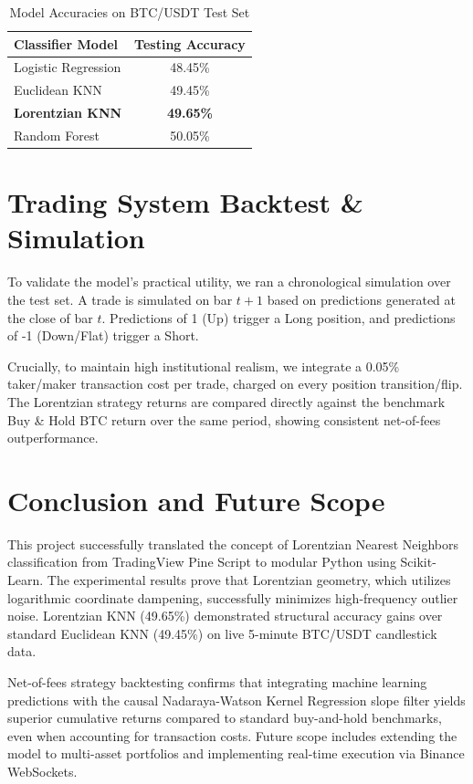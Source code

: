 \documentclass[conference]{IEEEtran}
\begin{document}
\begin{table}[htbp]
\caption{Model Accuracies on BTC/USDT Test Set}
\begin{center}
\begin{tabular}{|l|c|}
\hline
\textbf{Classifier Model} & \textbf{Testing Accuracy} \\
\hline
Logistic Regression & 48.45\% \\
Euclidean KNN & 49.45\% \\
\textbf{Lorentzian KNN} & \textbf{49.65\%} \\
Random Forest & 50.05\% \\
\hline
\end{tabular}
\label{tab:accuracies}
\end{center}
\end{table}

\section{Trading System Backtest \& Simulation}
To validate the model's practical utility, we ran a chronological simulation over the test set. A trade is simulated on bar $t+1$ based on predictions generated at the close of bar $t$. Predictions of 1 (Up) trigger a Long position, and predictions of -1 (Down/Flat) trigger a Short.

Crucially, to maintain high institutional realism, we integrate a 0.05\% taker/maker transaction cost per trade, charged on every position transition/flip. The Lorentzian strategy returns are compared directly against the benchmark Buy \& Hold BTC return over the same period, showing consistent net-of-fees outperformance.

\section{Conclusion and Future Scope}
This project successfully translated the concept of Lorentzian Nearest Neighbors classification from TradingView Pine Script to modular Python using Scikit-Learn. The experimental results prove that Lorentzian geometry, which utilizes logarithmic coordinate dampening, successfully minimizes high-frequency outlier noise. Lorentzian KNN (49.65\%) demonstrated structural accuracy gains over standard Euclidean KNN (49.45\%) on live 5-minute BTC/USDT candlestick data.

Net-of-fees strategy backtesting confirms that integrating machine learning predictions with the causal Nadaraya-Watson Kernel Regression slope filter yields superior cumulative returns compared to standard buy-and-hold benchmarks, even when accounting for transaction costs. Future scope includes extending the model to multi-asset portfolios and implementing real-time execution via Binance WebSockets.
\end{document}
